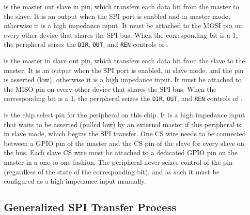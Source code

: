  is the master out slave in pin, which transfers each data bit from the master to the slave. It is an output when the SPI port is enabled and in master mode, otherwise it is a high impedance input. It must be attached to the MOSI pin on every other device that shares the SPI bus. When the corresponding  bit is a 1, the  peripheral seizes the \texttt{DIR}, \texttt{OUT}, and \texttt{REN} controls of .

 is the master in slave out pin, which transfers each data bit from the slave to the master. It is an output when the SPI port is enabled, in slave mode, and the  pin is asserted (low), otherwise it is a high impedance input. It must be attached to the MISO pin on every other device that shares the SPI bus. When the corresponding  bit is a 1, the  peripheral seizes the \texttt{DIR}, \texttt{OUT}, and \texttt{REN} controls of .

 is the chip select pin for the  peripheral on this chip. It is a high impedance input that waits to be asserted (pulled low) by an external master if this  peripheral is in slave mode, which begins the SPI transfer. One CS wire needs to be connected between a GPIO pin of the master and the CS pin of the slave for every slave on the bus. Each slave CS wire must be attached to a dedicated GPIO pin on the master in a one-to-one fashion. The  peripheral never seizes control of the  pin (regardless of the state of the corresponding  bit), and as such it must be configured as a high impedance input manually.

\subsection{Generalized SPI Transfer Process}

